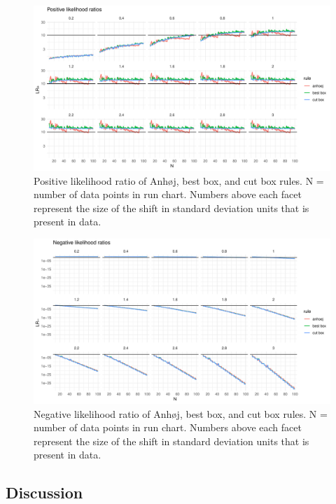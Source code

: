 \begin{figure}[htbp]
  \centering
  \includegraphics[width=\textwidth]{fig_lrpos.pdf}
  \caption{Positive likelihood ratio of Anhøj, best box, and cut box rules.
           N = number of data points in run chart.
           Numbers above each facet represent the size of the shift in standard
           deviation units that is present in data.}
  \label{figure:lrpos}
\end{figure}

\begin{figure}[htbp]
  \centering
  \includegraphics[width=\textwidth]{fig_lrneg.pdf}
  \caption{Negative likelihood ratio of Anhøj, best box, and cut box rules.
           N = number of data points in run chart.
           Numbers above each facet represent the size of the shift in standard
           deviation units that is present in data.}
  \label{figure:lrneg}
\end{figure}

\hypertarget{discussion}{%
\subsection{Discussion}\label{discussion}}

